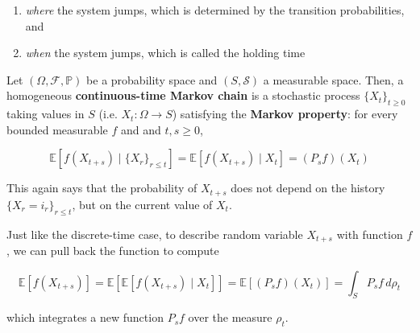 \documentclass{article}
\begin{document}
  \begin{enumerate}
    \item \textit{where} the system jumps, which is determined by the transition probabilities, and 
    \item \textit{when} the system jumps, which is called the holding time
  \end{enumerate}

  \begin{definition}[CTMP]
    Let $(\Omega, \mathcal{F}, \mathbb{P})$ be a probability space and $(S, \mathcal{S})$ a measurable space. Then, a homogeneous \textbf{continuous-time Markov chain} is a stochastic process $\{X_t\}_{t \geq 0}$ taking values in $S$ (i.e. $X_t: \Omega \rightarrow S$) satisfying the \textbf{Markov property}: for every bounded measurable $f$ and and $t, s \geq 0$, 

      \[\mathbb{E}[ f(X_{t + s}) \mid \{X_r\}_{r \leq t} ] = \mathbb{E}[ f(X_{t + s}) \mid X_t ] = (P_s f)(X_t)\]

    This again says that the probability of $X_{t + s}$ does not depend on the history $\{X_r = i_r\}_{r \leq t}$, but on the current value of $X_t$. 
  \end{definition}

  Just like the discrete-time case, to describe random variable $X_{t + s}$ with function $f$, we can pull back the function to compute 

    \[\mathbb{E}[f(X_{t + s})] = \mathbb{E}[ \mathbb{E}[ f(X_{t + s}) \mid X_t]] = \mathbb{E}[ (P_s f) (X_t)] = \int_S P_s f \, d\rho_t\]

  which integrates a new function $P_s f$ over the measure $\rho_t$. 
\end{document}
